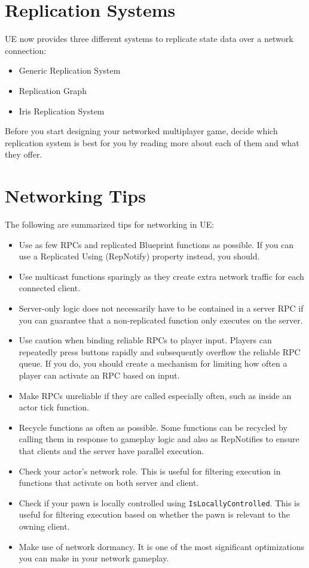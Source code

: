 \documentclass[
  letterpaper,
  DIV=11,
  numbers=noendperiod]{scrartcl}
\providecommand{\tightlist}{%
  \setlength{\itemsep}{0pt}\setlength{\parskip}{0pt}}
\begin{document}
\section{Replication Systems}\label{replication-systems}

UE now provides three different systems to replicate state data over a
network connection:

\begin{itemize}
\tightlist
\item
  Generic Replication System
\item
  Replication Graph
\item
  Iris Replication System
\end{itemize}

Before you start designing your networked multiplayer game, decide which
replication system is best for you by reading more about each of them
and what they offer.

\section{Networking Tips}\label{networking-tips}

The following are summarized tips for networking in UE:

\begin{itemize}
\tightlist
\item
  Use as few RPCs and replicated Blueprint functions as possible. If you
  can use a Replicated Using (RepNotify) property instead, you should.
\item
  Use multicast functions sparingly as they create extra network traffic
  for each connected client.
\item
  Server-only logic does not necessarily have to be contained in a
  server RPC if you can guarantee that a non-replicated function only
  executes on the server.
\item
  Use caution when binding reliable RPCs to player input. Players can
  repeatedly press buttons rapidly and subsequently overflow the
  reliable RPC queue. If you do, you should create a mechanism for
  limiting how often a player can activate an RPC based on input.
\item
  Make RPCs unreliable if they are called especially often, such as
  inside an actor tick function.
\item
  Recycle functions as often as possible. Some functions can be recycled
  by calling them in response to gameplay logic and also as RepNotifies
  to ensure that clients and the server have parallel execution.
\item
  Check your actor's network role. This is useful for filtering
  execution in functions that activate on both server and client.
\item
  Check if your pawn is locally controlled using
  \texttt{IsLocallyControlled}. This is useful for filtering execution
  based on whether the pawn is relevant to the owning client.
\item
  Make use of network dormancy. It is one of the most significant
  optimizations you can make in your network gameplay.
\end{itemize}
\end{document}
